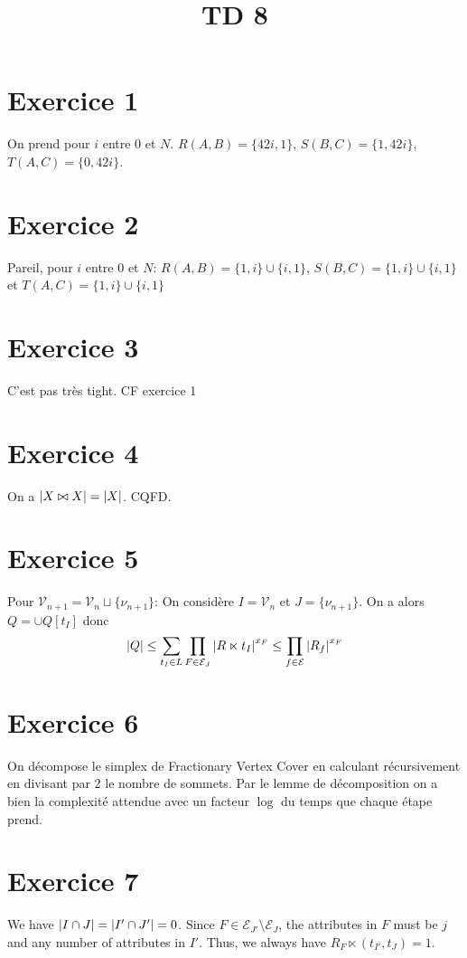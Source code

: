 \documentclass{cours}
\title{TD 8}
\begin{document}
\section{Exercice 1}
On prend pour $i$ entre $0$ et $N$. 
$R(A, B) = \{42i, 1\}$, $S(B, C) = \{1, 42i\}$, $T(A, C) = \{0, 42i\}$.  

\section{Exercice 2}
Pareil, pour $i$ entre $0$ et $N$: 
$R(A, B) = \{1, i\} \cup \{i, 1\}$, $S(B, C) = \{1, i\} \cup \{i, 1\}$ et $T(A, C) = \{1, i\} \cup \{i, 1\}$

\section{Exercice 3}
C'est pas très tight. CF exercice 1

\section{Exercice 4}
On a $\left|X \bowtie X\right| = \left|X\right|$. CQFD.  

\section{Exercice 5}
Pour $\mathcal{V}_{n + 1}= \mathcal{V}_{n} \sqcup \{\nu_{n+1}\}$:
On considère $I = \mathcal{V}_{n}$ et $J = \{\nu_{n+1}\}$. On a alors $Q = \cup Q[t_I]$ donc 
\begin{equation*}
	\left|Q\right| \leq \sum_{t_{I} \in L}\prod_{F \in \mathcal{E}_{J}} \left|R\ltimes t_{I}\right|^{x_{F}} \leq \prod_{f \in \mathcal{E}} \left|R_{f}\right|^{x_{F}}
\end{equation*}

\section{Exercice 6}
On décompose le simplex de {\sc Fractionary Vertex Cover} en calculant récursivement en divisant par 2 le nombre de sommets. Par le lemme de décomposition on a bien la complexité attendue avec un facteur $\log$ du temps que chaque étape prend. 

\section{Exercice 7}
We have $\left|I \cap J\right| = \left|I'\cap J'\right| = 0$. 
Since $F \in \mathcal{E}_{J'} \setminus \mathcal{E}_{J}$, the attributes in $F$ must be $j$ and any number of attributes in $I'$. Thus, we always have $R_{F} \ltimes (t_{I'}, t_{J}) = 1$.
\end{document}
